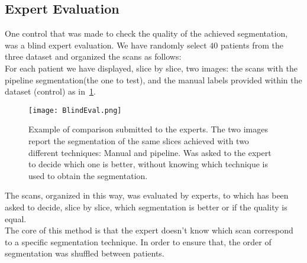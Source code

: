 \documentclass{standalone}
\begin{document}
	\subsection{Expert Evaluation}
	
	One control that was made to check the quality of the achieved segmentation, was a blind expert evaluation. We have randomly select $40$ patients from the three dataset and organized the scans as follows: \\
	For each patient we have displayed, slice by slice,  two images: the scans with the pipeline segmentation(the one to test), and the manual labels provided within the dataset (control) as in \figurename\,\ref{fig:Blind}.
	
	\begin{figure}[h!]
		\centering
			\texttt{[image: BlindEval.png]}
			\caption{Example of comparison submitted to the experts. The two images report the segmentation of the same slices achieved with two different techniques: Manual and pipeline. Was asked to the expert to decide which one is better, without knowing which technique is used to obtain the segmentation.}\label{fig:Blind}
	\end{figure}

	The scans, organized in this way, was evaluated by experts, to which has been asked to decide, slice by slice, which segmentation is better or if the quality is equal.\\ The core of this method is that the expert doesn't know which scan correspond to a specific segmentation technique.  In order to ensure that, the order of segmentation was shuffled between patients.

	
\end{document}
